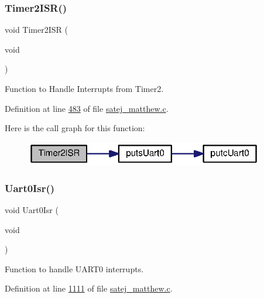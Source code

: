 \subsubsection{\texorpdfstring{Timer2ISR()}{Timer2ISR()}}
{\footnotesize\ttfamily void Timer2\+I\+SR (\begin{DoxyParamCaption}\item[{void}]{ }\end{DoxyParamCaption})}



Function to Handle Interrupts from Timer2. 



Definition at line \mbox{\hyperlink{satej__matthew_8c_source_l00483}{483}} of file \mbox{\hyperlink{satej__matthew_8c_source}{satej\+\_\+matthew.\+c}}.

Here is the call graph for this function\+:
\nopagebreak
\begin{figure}[H]
\begin{center}
\leavevmode
\includegraphics[width=296pt]{satej__matthew_8c_af0a12620be9cfe02c43ff4c8d6556fe2_cgraph}
\end{center}
\end{figure}
\mbox{\label{satej__matthew_8c_a039b2e346ff80ac384bb076fc5290996}} 
\subsubsection{\texorpdfstring{Uart0Isr()}{Uart0Isr()}}
{\footnotesize\ttfamily void Uart0\+Isr (\begin{DoxyParamCaption}\item[{void}]{ }\end{DoxyParamCaption})}



Function to handle U\+A\+R\+T0 interrupts. 



Definition at line \mbox{\hyperlink{satej__matthew_8c_source_l01111}{1111}} of file \mbox{\hyperlink{satej__matthew_8c_source}{satej\+\_\+matthew.\+c}}.

